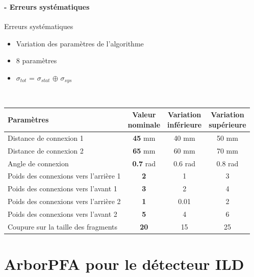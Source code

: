 \documentclass[8pt]{beamer}
\begin{document}
  \begin{frame}
  \frametitle{\secname}
  \framesubtitle{\subsecname - Erreurs systématiques}
    \begin{block}{Erreurs systématiques}
      \begin{itemize}
        \item Variation des paramètres de l'algorithme
        \item 8 paramètres
        \item $\sigma_{tot}$ = $\sigma_{stat}$ $\oplus$ $\sigma_{sys}$
      \end{itemize}
    \end{block}
    ~ \\
    \begin{center}
      \begin{tabular}{l c c c}
         Paramètres & \makecell{Valeur \\ nominale} & \makecell{Variation \\ inférieure} & \makecell{Variation \\ supérieure} \\
         \hline
         Distance de connexion 1               & \textbf{45} mm   & 40 mm   & 50 mm    \\
         Distance de connexion 2               & \textbf{65} mm   & 60 mm   & 70 mm    \\
         Angle de connexion                    & \textbf{0.7} rad & 0.6 rad & 0.8 rad   \\
         Poids des connexions vers l'arrière 1 & \textbf{2}       & 1       & 3        \\
         Poids des connexions vers l'avant 1   & \textbf{3}       & 2       & 4        \\
         Poids des connexions vers l'arrière 2 & \textbf{1}       & 0.01    & 2       \\
         Poids des connexions vers l'avant 2   & \textbf{5}       & 4       & 6        \\
         Coupure sur la taille des fragments   & \textbf{20}      & 15      & 25         \\
       \end{tabular}
    \end{center}

  \end{frame}





  \section{ArborPFA pour le détecteur ILD}
\end{document}
